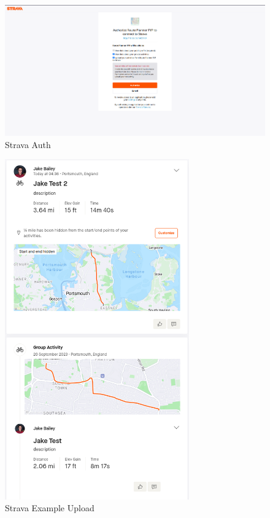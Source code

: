 \begin{figure}[!ht]
    \centering
    \includegraphics[width=425px]{figures/Progress Images/Iteration-2/SR18/SR18 Strava Auth.png}
    \caption{Strava Auth}
    \label{fig:auth-strava}
\end{figure}

\begin{figure}[!ht]
    \centering
    \includegraphics[width=300px]{figures/Progress Images/Iteration-2/SR18/SR18 Strava Example 3.png}
    \caption{Strava Example Upload}
    \label{fig:upload-strava}
\end{figure}

